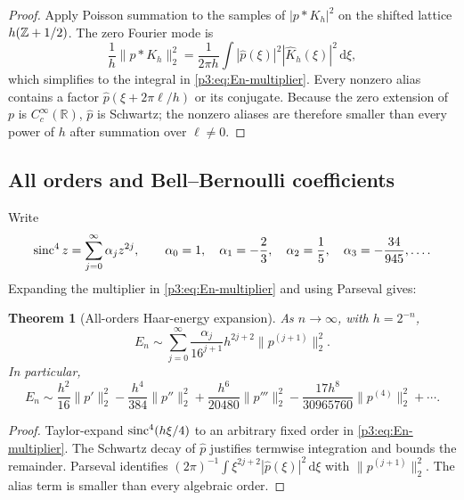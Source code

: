 \documentclass[11pt]{article}
\newtheorem{theorem}{Theorem}[section]
\theoremstyle{definition}
\theoremstyle{remark}
\newcommand{\R}{\mathbb R}
\newcommand{\dd}{\,\mathrm d}
\begin{document}
\begin{proof}
Apply Poisson summation to the samples of $|p*K_h|^2$ on the shifted lattice
$h(\mathbb Z+1/2)$.  The zero Fourier mode is
\[
 \frac1h\|p*K_h\|_2^2
 =\frac1{2\pi h}\int|\widehat p(\xi)|^2
 |\widehat K_h(\xi)|^2\dd\xi,
\]
which simplifies to the integral in \eqref{p3:eq:En-multiplier}.  Every nonzero
alias contains a factor $\widehat p(\xi+2\pi\ell/h)$ or its conjugate.
Because the zero extension of $p$ is $C_c^\infty(\R)$,
$\widehat p$ is Schwartz; the nonzero aliases are therefore smaller than every
power of $h$ after summation over $\ell\ne0$.
\end{proof}

\subsection{All orders and Bell--Bernoulli coefficients}

Write
\begin{equation}\label{p3:eq:alpha-sinc4}
 \operatorname{sinc}^4z=\sum_{j=0}^\infty\alpha_jz^{2j},
 \qquad
 \alpha_0=1,\quad \alpha_1=-\frac23,
 \quad \alpha_2=\frac15,
 \quad \alpha_3=-\frac{34}{945},\ldots.
\end{equation}
Expanding the multiplier in \eqref{p3:eq:En-multiplier} and using Parseval gives:

\begin{theorem}[All-orders Haar-energy expansion]
\label{p3:thm:Haar-energy-all-orders}
As $n\to\infty$, with $h=2^{-n}$,
\begin{equation}\label{p3:eq:En-all-orders}
 E_n\sim\sum_{j=0}^\infty
 \frac{\alpha_j}{16^{j+1}}h^{2j+2}
 \|p^{(j+1)}\|_2^2.
\end{equation}
In particular,
\begin{equation}\label{p3:eq:En-first-terms}
 E_n\sim
 \frac{h^2}{16}\|p'\|_2^2
 -\frac{h^4}{384}\|p''\|_2^2
 +\frac{h^6}{20480}\|p'''\|_2^2
 -\frac{17h^8}{30965760}\|p^{(4)}\|_2^2+\cdots.
\end{equation}
\end{theorem}

\begin{proof}
Taylor-expand $\operatorname{sinc}^4(h\xi/4)$ to an arbitrary fixed order in
\eqref{p3:eq:En-multiplier}.  The Schwartz decay of $\widehat p$ justifies
termwise integration and bounds the remainder.  Parseval identifies
$(2\pi)^{-1}\int\xi^{2j+2}|\widehat p(\xi)|^2\dd\xi$ with
$\|p^{(j+1)}\|_2^2$.  The alias term is smaller than every algebraic order.
\end{proof}
\end{document}
